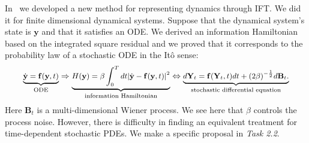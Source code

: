 In~\cite{hao2023information} we developed a new method for representing dynamics through IFT.
We did it for finite dimensional dynamical systems.
Suppose that the dynamical system's state is $\mathbf{y}$ and that it satisfies an ODE.
We derived an information Hamiltonian based on the integrated square residual and we proved that it corresponds to the probability law of a stochastic ODE in the It\^o sense:
$$
\small
\underbrace{\dot{\mathbf{y}} = \mathbf{f}(\mathbf{y},t)}_{\text{ODE}}\Rightarrow
\underbrace{H(\mathbf{y}) = \beta\int_0^Tdt|\dot{\mathbf{y}} - \mathbf{f}(\mathbf{y},t)|^2}_{\text{information Hamiltonian}}\Leftrightarrow
\underbrace{d\mathbf{Y}_t = \mathbf{f}(\mathbf{Y}_t,t)dt + (2\beta)^{-\frac{1}{2}}d\mathbf{B}_t.}_{\text{stochastic differential equation}}
$$
Here $\mathbf{B}_t$ is a multi-dimensional Wiener process.
We see here that $\beta$ controls the process noise.
However, there is difficulty in finding an equivalent treatment for time-dependent stochastic PDEs.
We make a specific proposal in \emph{Task 2.2}.

